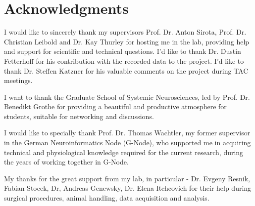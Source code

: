 \documentclass[twoside, 12pt,  footinclude=true, headinclude=true, cleardoublepage=empty]{scrbook}
\begin{document}


\frontmatter

\chapter{Acknowledgments}

I would like to sincerely thank my supervisors Prof. Dr. Anton Sirota, Prof. Dr. Christian Leibold and Dr. Kay Thurley for hosting me in the lab, providing help and support for scientific and technical questions. I'd like to thank Dr. Dustin Fetterhoff for his contribution with the recorded data to the project. I'd like to thank Dr. Steffen Katzner for his valuable comments on the project during TAC meetings.

I want to thank the Graduate School of Systemic Neurosciences, led by Prof. Dr. Benedikt Grothe for providing a beautiful and productive atmosphere for students, suitable for networking and discussions.

I would like to specially thank Prof. Dr. Thomas Wachtler, my former supervisor in the German Neuroinformatics Node (G-Node), who supported me in acquiring technical and physiological knowledge required for the current research, during the years of working together in G-Node.

My thanks for the great support from my lab, in particular - Dr. Evgeny Resnik, Fabian Stocek, Dr, Andreas Genewsky, Dr. Elena Itchcovich for their help during surgical procedures, animal handling, data acquisition and analysis.



\tableofcontents

\listoffigures




\mainmatter













\printbibliography

\backmatter


\end{document}
